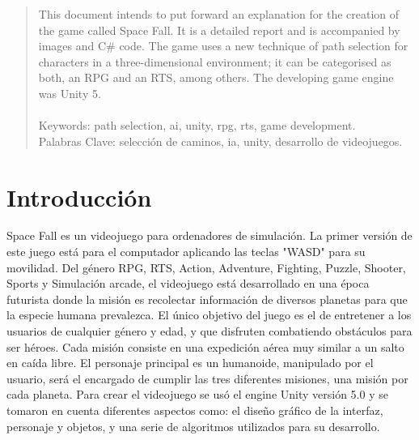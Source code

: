 \documentclass[12pt, conference]{IEEEtran}
\begin{document}




\maketitle

\begin{abstract}

This document intends to put forward an explanation for the creation of the game called Space Fall. It is a detailed report and is accompanied by images and C\# code. The game uses a new technique of path selection for characters in a three-dimensional environment; it can be categorised as both, an RPG and an RTS, among others. The developing game engine was Unity 5.\\ \\
Keywords: path selection, ai, unity, rpg, rts, game development.\\
Palabras Clave: selecci\'{o}n de caminos, ia, unity, desarrollo de videojuegos.
\end{abstract}





%
\IEEEpeerreviewmaketitle



\section{Introducci\'{o}n}

Space Fall es un videojuego para ordenadores de simulaci\'{o}n. La primer versi\'{o}n de este juego est\'{a} para el computador aplicando las teclas "WASD" para su movilidad. Del g\'{e}nero RPG, RTS, Action, Adventure, Fighting, Puzzle, Shooter, Sports y Simulaci\'{o}n arcade, el videojuego est\'{a} desarrollado en una \'{e}poca futurista donde la misi\'{o}n es recolectar informaci\'{o}n de diversos planetas para que la especie humana prevalezca. El \'{u}nico objetivo del juego es el de entretener a los usuarios de cualquier g\'{e}nero y edad, y que disfruten combatiendo obst\'{a}culos para ser h\'{e}roes. Cada misi\'{o}n consiste en una expedici\'{o}n a\'{e}rea muy similar a un salto en ca\'{i}da libre. El personaje principal es un humanoide, manipulado por el usuario, ser\'{a} el encargado de cumplir las tres diferentes misiones, una misi\'{o}n por cada planeta. Para crear el videojuego se us\'{o} el engine Unity versi\'{o}n 5.0 y se tomaron en cuenta diferentes aspectos como: el dise\~{n}o gr\'{a}fico de la interfaz, personaje y objetos, y una serie de algoritmos utilizados para su desarrollo.\\
\end{document}
